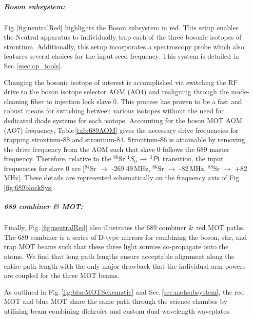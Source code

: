 \subparagraph{Boson subsystem:}
Fig.\,\ref{fig:neutralRed} highlights the Boson subsystem in red.
This setup enables the Neutral apparatus to individually trap each of the three bosonic isotopes of strontium.
Additionally, this setup incorporates a spectroscopy probe which also features several choices for the input seed frequency. 
This system is detailed in Sec.\,\ref{ssec:op_tools}.

Changing the bosonic isotope of interest is accomplished via switching the RF drive to the boson isotope selector AOM (AO4) and realigning through the mode-cleaning fiber to injection lock slave 0.
This process has proven to be a fast and robust means for switching between various isotopes without the need for dedicated diode systems for each isotope.
Accounting for the boson MOT AOM (AO7) frequency, Table\,\ref{tab:689AOM} gives the necessary drive frequencies for trapping strontium-88 and strontium-84.
Strontium-86 is attainable by removing the drive frequency from the AOM such that slave 0 follows the 689 master frequency.
Therefore, relative to the $^{88}$Sr $^1S_0\,\rightarrow\,^3P1$ transition, the input frequencies for slave 0 are [$^{84}$Sr $\rightarrow$ -269.49\,MHz, $^{86}$Sr $\rightarrow$ -82\,MHz, $^{88}$Sr $\rightarrow$ +82\,MHz].
These details are represented schematically on the frequency axis of Fig.\,\ref{fig:689blockSys}.
	
\subparagraph{689 combiner \& MOT:}
Finally, Fig.\,\ref{fig:neutralRed} also illustrates the 689 combiner \& red MOT paths.
The 689 combiner is a series of D-type mirrors for combining the boson, stir, and trap MOT beams such that these three light sources co-propagate onto the atoms.
We find that long path lengths ensure acceptable alignment along the entire path length with the only major drawback that the individual arm powers are coupled for the three MOT beams.

As outlined in Fig.\,\ref{fig:blueMOTSchematic} and Sec.\,\ref{sec:motsubsystem}, the red MOT and blue MOT share the same path through the science chamber by utilizing beam combining dichroics and custom dual-wavelength waveplates.

